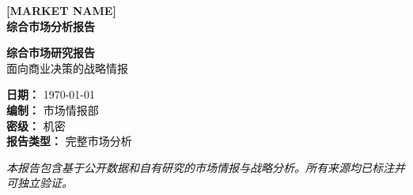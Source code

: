 \documentclass[11pt,letterpaper]{report}
\newcommand{\reporttitle}{[MARKET NAME]}
\newcommand{\reportsubtitle}{综合市场分析报告}
\newcommand{\reportdate}{\today}
\newcommand{\reportauthor}{市场情报部}
\newcommand{\reportclassification}{机密}
\begin{document}

\begin{titlepage}
\centering
\vspace*{2cm}

{\Huge\bfseries\color{primaryblue} \reporttitle\\[0.5cm]}
{\LARGE\bfseries \reportsubtitle\\[1.5cm]}


\vspace{4cm}

{\Large\bfseries 综合市场研究报告\\[0.5cm]}
{\large 面向商业决策的战略情报\\[3cm]}

{\large
\textbf{日期：} \reportdate\\[0.3cm]
\textbf{编制：} \reportauthor\\[0.3cm]
\textbf{密级：} \reportclassification\\[0.3cm]
\textbf{报告类型：} 完整市场分析
}

\vfill

{\footnotesize
\textit{本报告包含基于公开数据和自有研究的市场情报与战略分析。所有来源均已标注并可独立验证。}
}

\end{titlepage}


\tableofcontents
\newpage

\listoffigures
\newpage

\listoftables
\newpage

\end{document}
